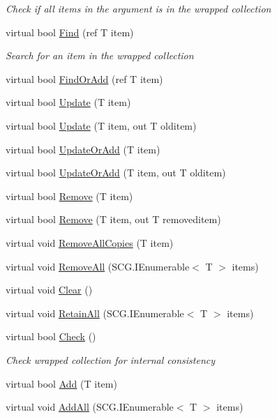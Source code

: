 \begin{DoxyCompactItemize}
\begin{DoxyCompactList}\small\item\em Check if all items in the argument is in the wrapped collection \end{DoxyCompactList}\item 
virtual bool \hyperlink{class_c5_1_1_guarded_collection_ab447aa674e79536b0c92f7010101ce89}{Find} (ref T item)
\begin{DoxyCompactList}\small\item\em Search for an item in the wrapped collection \end{DoxyCompactList}\item 
virtual bool \hyperlink{class_c5_1_1_guarded_collection_a06f9fdffc49fe7e5d618366b749fe8be}{Find\+Or\+Add} (ref T item)
\item 
virtual bool \hyperlink{class_c5_1_1_guarded_collection_a352f685be2677d2df5225e50aecb21cf}{Update} (T item)
\item 
virtual bool \hyperlink{class_c5_1_1_guarded_collection_a71d59b799800f0271a6a36a6fdea2f53}{Update} (T item, out T olditem)
\item 
virtual bool \hyperlink{class_c5_1_1_guarded_collection_a8cf85ddaca2e6fc07d6c4461feb9981f}{Update\+Or\+Add} (T item)
\item 
virtual bool \hyperlink{class_c5_1_1_guarded_collection_a0ff18d72c676480a225f9d3e3dacfcd0}{Update\+Or\+Add} (T item, out T olditem)
\item 
virtual bool \hyperlink{class_c5_1_1_guarded_collection_a5228eac1c6eb5341b2ab20a3095fa066}{Remove} (T item)
\item 
virtual bool \hyperlink{class_c5_1_1_guarded_collection_afa3304903fb8b724e52bb6cc4f12e6a9}{Remove} (T item, out T removeditem)
\item 
virtual void \hyperlink{class_c5_1_1_guarded_collection_a912c6184ee4b074c3981f9dde491a94b}{Remove\+All\+Copies} (T item)
\item 
virtual void \hyperlink{class_c5_1_1_guarded_collection_ab5e36593deb380b90bb35f7a283e48fc}{Remove\+All} (S\+C\+G.\+I\+Enumerable$<$ T $>$ items)
\item 
virtual void \hyperlink{class_c5_1_1_guarded_collection_ae26dd6085a063dd2b86d37b030b87750}{Clear} ()
\item 
virtual void \hyperlink{class_c5_1_1_guarded_collection_addd89e0bb9db15b64f24d64b7720761d}{Retain\+All} (S\+C\+G.\+I\+Enumerable$<$ T $>$ items)
\item 
virtual bool \hyperlink{class_c5_1_1_guarded_collection_adff17cbe1d82defc187161f1038225fe}{Check} ()
\begin{DoxyCompactList}\small\item\em Check wrapped collection for internal consistency \end{DoxyCompactList}\item 
virtual bool \hyperlink{class_c5_1_1_guarded_collection_aa7fe8941b3b05d9e8622b830852cf12d}{Add} (T item)
\item 
virtual void \hyperlink{class_c5_1_1_guarded_collection_ac93971d6ad817a2797bf01dbb1d30d12}{Add\+All} (S\+C\+G.\+I\+Enumerable$<$ T $>$ items)
\end{DoxyCompactItemize}
